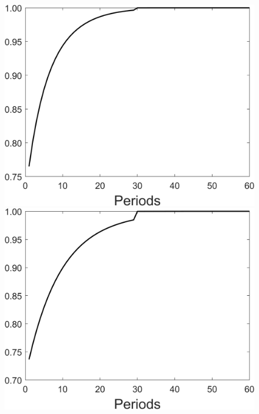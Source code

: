 \begin{figure}[h!!]
\begin{minipage}[]{0.32\textwidth}
	\includegraphics[width=1\textwidth]{../codding_model/Own/figures/Rep_agent/staticRam_LF_separate_tauul_periods59_eppsilon4.00_zeta1.40_Ad08_Ac04_thetac0.70_thetad0.56_HetGrowth1_tauul0.181_util0_withtarget1_lgd0.png}
\end{minipage}
\begin{minipage}[]{0.32\textwidth}
	\includegraphics[width=1\textwidth]{../codding_model/Own/figures/Rep_agent/staticRam_LF_separate_tauul_periods59_eppsilon0.40_zeta1.40_Ad08_Ac04_thetac0.70_thetad0.56_HetGrowth1_tauul0.181_util0_withtarget1_lgd0.png}
\end{minipage}
\end{figure}


